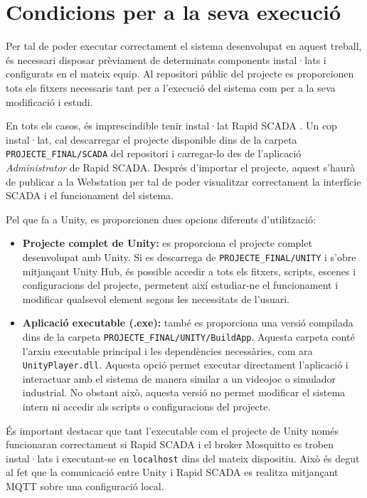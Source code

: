 \documentclass[12pt,a4paper]{report}
\begin{document}
\chapter{Condicions per a la seva execució}

Per tal de poder executar correctament el sistema desenvolupat en aquest treball, és necessari disposar prèviament de determinats components instal·lats i configurats en el mateix equip. Al repositori públic del projecte es proporcionen tots els fitxers necessaris tant per a l'execució del sistema com per a la seva modificació i estudi.

En tots els casos, és imprescindible tenir instal·lat Rapid SCADA \cite{rapidscada_windows_install}. Un cop instal·lat, cal descarregar el projecte disponible dins de la carpeta \texttt{PROJECTE\_FINAL/SCADA} del repositori i carregar-lo des de l'aplicació \textit{Administrator} de Rapid SCADA. Després d'importar el projecte, aquest s'haurà de publicar a la Webstation per tal de poder visualitzar correctament la interfície SCADA i el funcionament del sistema.

Pel que fa a Unity, es proporcionen dues opcions diferents d'utilització:

\begin{itemize}
    \item \textbf{Projecte complet de Unity:} es proporciona el projecte complet desenvolupat amb Unity. Si es descarrega de \texttt{PROJECTE\_FINAL/UNITY} i s'obre mitjançant Unity Hub, és possible accedir a tots els fitxers, scripts, escenes i configuracions del projecte, permetent així estudiar-ne el funcionament i modificar qualsevol element segons les necessitats de l'usuari.

    \item \textbf{Aplicació executable (.exe):} també es proporciona una versió compilada dins de la carpeta \texttt{PROJECTE\_FINAL/UNITY/BuildApp}. Aquesta carpeta conté l'arxiu executable principal i les dependències necessàries, com ara \texttt{UnityPlayer.dll}. Aquesta opció permet executar directament l'aplicació i interactuar amb el sistema de manera similar a un videojoc o simulador industrial. No obstant això, aquesta versió no permet modificar el sistema intern ni accedir als scripts o configuracions del projecte.
\end{itemize}

És important destacar que tant l'executable com el projecte de Unity només funcionaran correctament si Rapid SCADA i el broker Mosquitto es troben instal·lats i executant-se en \texttt{localhost} dins del mateix dispositiu. Això és degut al fet que la comunicació entre Unity i Rapid SCADA es realitza mitjançant MQTT sobre una configuració local.
\end{document}
